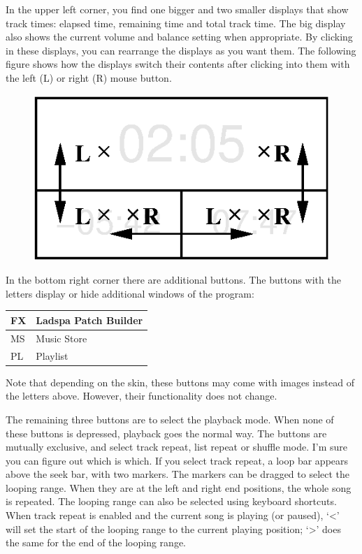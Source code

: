 \documentclass[10pt,english]{article}
\begin{document}
In the upper left corner, you find one bigger and two
smaller displays that show track times: elapsed time,
remaining time and total track time. The big display also
shows the current volume and balance setting when
appropriate. By clicking in these displays, you can rearrange
the displays as you want them. The following figure shows how
the displays switch their contents after clicking into them
with the left (L) or right (R) mouse button.


\begin{figure}[h!] \centering \includegraphics[scale=0.7]{timer.eps}\end{figure}



\noindent In the bottom right corner there are additional
buttons. The buttons with the letters display or hide
additional windows of the program:


\begin{center}\begin{tabular}{|l|l|}\hline 

FX&
Ladspa Patch Builder
\\ \hline 

MS&
Music Store
\\ \hline 

PL&
Playlist
\\ \hline 
\end{tabular}\end{center}



\noindent Note that depending on the skin, these buttons may come
with images instead of the letters above. However, their
functionality does not change.




The remaining three buttons are to select the playback
mode. When none of these buttons is depressed, playback goes
the normal way. The buttons are mutually exclusive, and select
track repeat, list repeat or shuffle mode. I'm sure you can
figure out which is which. If you select track repeat, a loop
bar appears above the seek bar, with two markers. The markers
can be dragged to select the looping range. When they are at
the left and right end positions, the whole song is repeated.
The looping range can also be selected using keyboard
shortcuts. When track repeat is enabled and the current song
is playing (or paused), `<' will set the start of the
looping range to the current playing position; `>' does
the same for the end of the looping range.
\end{document}
